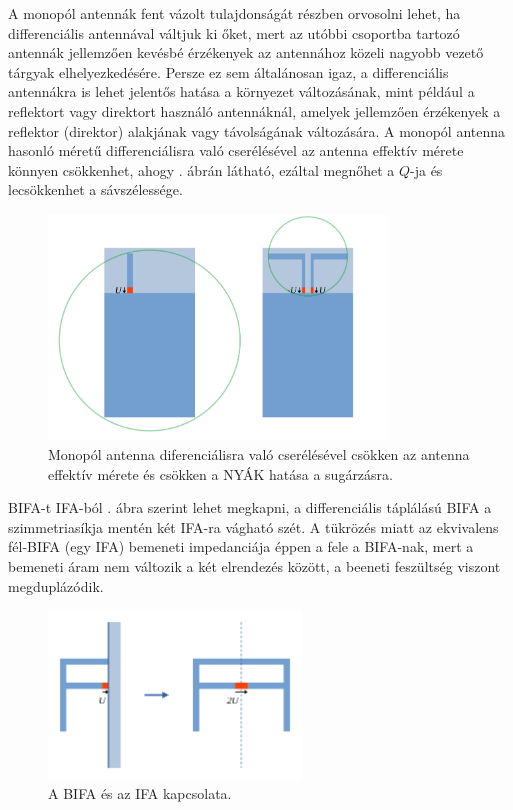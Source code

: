 \par A monopól antennák fent vázolt tulajdonságát részben orvosolni lehet, ha differenciális antennával váltjuk ki őket, mert az utóbbi csoportba tartozó antennák jellemzően kevésbé érzékenyek az antennához közeli nagyobb vezető tárgyak elhelyezkedésére. Persze ez sem általánosan igaz, a differenciális antennákra is lehet jelentős hatása a környezet változásának, mint például a reflektort vagy direktort használó antennáknál, amelyek jellemzően érzékenyek a reflektor (direktor) alakjának vagy távolságának változására. A monopól antenna hasonló méretű differenciálisra való cserélésével az antenna effektív mérete könnyen csökkenhet, ahogy . ábrán látható, ezáltal megnőhet a $Q$-ja és lecsökkenhet a sávszélessége.
\begin{figure}[h]
	\centering
	\includegraphics[width=0.8\textwidth]{kep/se-diff.pdf}
	\caption{Monopól antenna diferenciálisra való cserélésével csökken az antenna effektív mérete és csökken a NYÁK hatása a sugárzásra.}
	\label{fig:se-diff}
\end{figure}
\par BIFA-t IFA-ból . ábra szerint lehet megkapni, a differenciális táplálású BIFA a szimmetriasíkja mentén két IFA-ra vágható szét. A tükrözés miatt az ekvivalens fél-BIFA (egy IFA) bemeneti impedanciája éppen a fele a BIFA-nak, mert a bemeneti áram nem változik a két elrendezés között, a beeneti feszültség viszont megduplázódik.
\begin{figure}[h]
	\centering
	\includegraphics[width=0.6\textwidth]{kep/ifa-bifa.pdf}
	\caption{A BIFA és az IFA kapcsolata.}
	\label{fig:ifa-bifa}
\end{figure}
